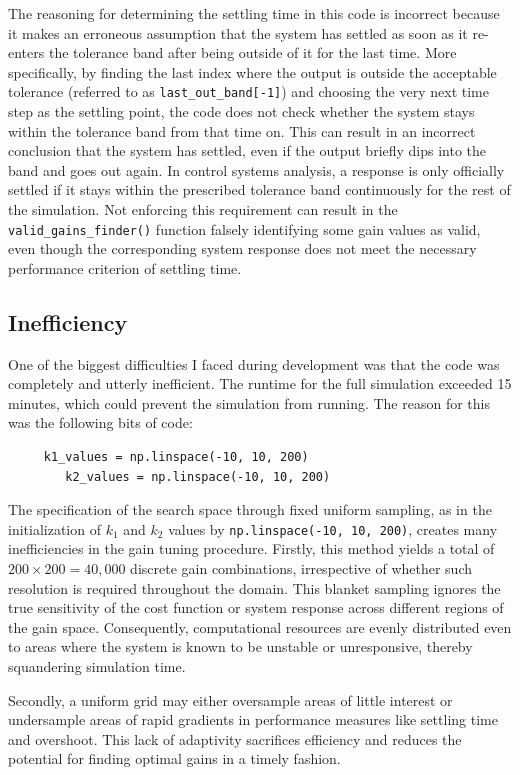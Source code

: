 \documentclass{ifacconf}
\begin{document}
The reasoning for determining the settling time in this code is incorrect because it makes an erroneous assumption that the system has settled as soon as it re-enters the tolerance band after being outside of it for the last time. More specifically, by finding the last index where the output is outside the acceptable tolerance (referred to as \texttt{last\_out\_band[-1]}) and choosing the very next time step as the settling point, the code does not check whether the system stays within the tolerance band from that time on. This can result in an incorrect conclusion that the system has settled, even if the output briefly dips into the band and goes out again. In control systems analysis, a response is only officially settled if it stays within the prescribed tolerance band continuously for the rest of the simulation. Not enforcing this requirement can result in the \texttt{valid\_gains\_finder()} function falsely identifying some gain values as valid, even though the corresponding system response does not meet the necessary performance criterion of settling time.

\subsection{Inefficiency}
One of the biggest difficulties I faced during development was that the code was completely and utterly inefficient. The runtime for the full simulation exceeded 15 minutes, which could prevent the simulation from running. The reason for this was the following bits of code:
\begin{verbatim}
     k1_values = np.linspace(-10, 10, 200)
        k2_values = np.linspace(-10, 10, 200)
\end{verbatim}

The specification of the search space through fixed uniform sampling, as in the initialization of $k_1$ and $k_2$ values by \texttt{np.linspace(-10, 10, 200)}, creates many inefficiencies in the gain tuning procedure. Firstly, this method yields a total of $200 \times 200 = 40{,}000$ discrete gain combinations, irrespective of whether such resolution is required throughout the domain. This blanket sampling ignores the true sensitivity of the cost function or system response across different regions of the gain space. Consequently, computational resources are evenly distributed even to areas where the system is known to be unstable or unresponsive, thereby squandering simulation time.

Secondly, a uniform grid may either oversample areas of little interest or undersample areas of rapid gradients in performance measures like settling time and overshoot. This lack of adaptivity sacrifices efficiency and reduces the potential for finding optimal gains in a timely fashion.
\end{document}
